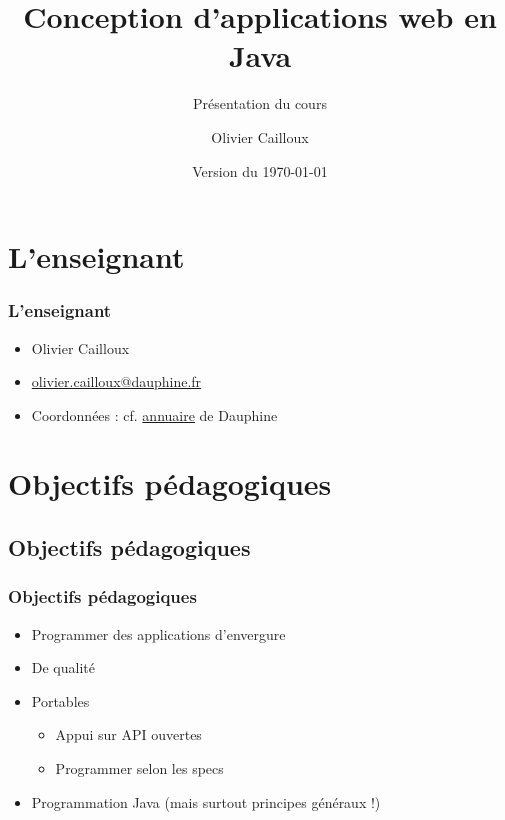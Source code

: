 \documentclass[english, french]{beamer}
\title{Conception d’applications web en Java}
\subtitle{Présentation du cours}
\author{Olivier Cailloux}
\institute[LAMSADE]{LAMSADE, Université Paris-Dauphine}
\date{Version du \today}
\begin{document}


\begin{frame}[plain]
   \titlepage
\end{frame}
\addtocounter{framenumber}{-1}

\section{L’enseignant}
\begin{frame}
	\frametitle{L’enseignant}
	\begin{itemize}
		\item Olivier Cailloux
		\item \href{mailto:olivier.cailloux@dauphine.fr}{olivier.cailloux@dauphine.fr}
		\item Coordonnées : cf. \href{https://annuaire.dauphine.psl.eu/annuaire/index.php?param0=fiche&param1=ocailloux}{annuaire} de Dauphine
	\end{itemize}
\end{frame}

\section[Obj. pédagogiques]{Objectifs pédagogiques}
\subsection{Objectifs pédagogiques}
\begin{frame}
	\frametitle{Objectifs pédagogiques}
	\begin{itemize}
		\item Programmer des applications d’envergure
		\item De qualité
		\item Portables
		\begin{itemize}
			\item Appui sur API ouvertes
			\item Programmer selon les specs
		\end{itemize}
		\item Programmation Java (mais surtout principes généraux !)
	\end{itemize}
\end{frame}
\end{document}
